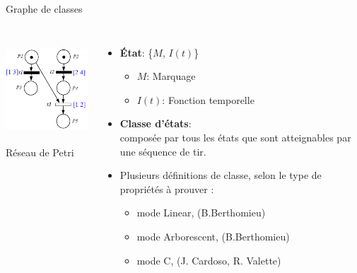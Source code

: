 \documentclass[compress]{beamer}
\begin{document}
\begin{frame}{Graphe de classes}
\begin{columns}
	\begin{center}
		\includegraphics[height=4cm]{rdp_temps_ch}\\
		Réseau de Petri 
	\end{center}
	\begin{itemize}
	\item \textbf{État}: \{$M$, $I(t)$\}
		\begin{itemize}
		\item $M$: Marquage
		\item $I(t)$: Fonction temporelle
		\end{itemize}
	\item \textbf{Classe d'états}:\\
		\small composée par tous les états que sont atteignables par une séquence de tir.
	\item Plusieurs définitions de classe, selon le type de propriétés à prouver :
		\begin{itemize}
		\item mode Linear,  {\footnotesize (B.Berthomieu)} %
		\item mode Arborescent,  {\footnotesize (B.Berthomieu)} %
		\item mode C,  {\footnotesize (J. Cardoso, R. Valette)} 
		\end{itemize}
	\end{itemize}
\end{columns}
\end{frame}
\end{document}
